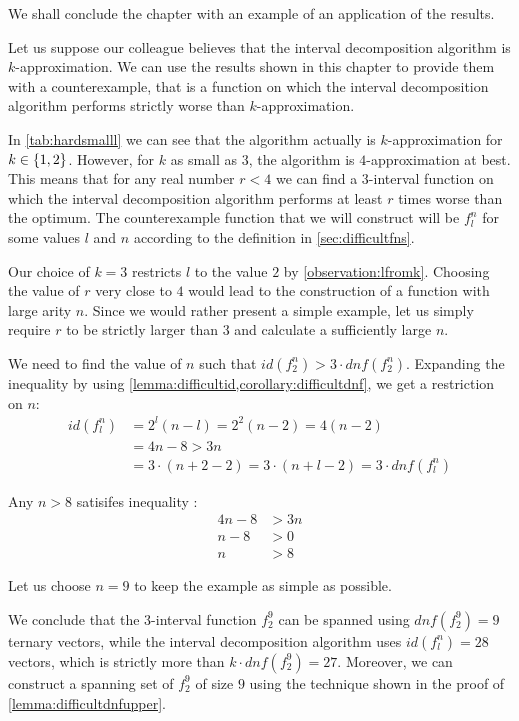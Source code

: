 We shall conclude the chapter with an example
of an application of the results.
\begin{example}
\label{example:approxidf24}
Let us
suppose our colleague believes
that the interval decomposition algorithm
is $k$-approximation.
We can use the results shown in this chapter
to provide them with a counterexample,
that is a function on which
the interval decomposition algorithm
performs strictly worse than $k$-approximation.

In \cref{tab:hardsmalll} we can see that the algorithm
actually is $k$-approximation for $k \in \{1, 2\}$.
However, for $k$ as small as $3$,
the algorithm is $4$-approximation at best.
This means that for any real number $r < 4$
we can find a $3$-interval function on which
the interval decomposition algorithm
performs at least $r$ times worse than the optimum.
The counterexample function that we will construct
will be $f_l^n$ for some values $l$ and $n$
according to the definition in \cref{sec:difficultfns}.

Our choice of $k=3$ restricts $l$ to the value $2$
by \cref{observation:lfromk}.
Choosing the value of $r$ very close to $4$
would lead to the construction of a function
with large arity $n$.
Since we would rather present a simple example,
let us
simply require $r$ to be strictly larger than $3$
and calculate a sufficiently large $n$.

We need to find the value of $n$ such that
$id(f_2^n) > 3 \cdot dnf(f_2^n)$.
Expanding the inequality by using
\cref{lemma:difficultid,corollary:difficultdnf},
we get a restriction on $n$:
\begin{align}
id(f_l^n) &= 2^l(n-l)
= 2^2(n-2)
= 4 (n-2) \nonumber \\
&= 4n - 8
> 3n
\label{ineq:examplef29} \\
&= 3 \cdot (n+2-2)
= 3 \cdot (n+l-2)
= 3 \cdot \mathit{dnf}(f_l^n) \nonumber
\end{align}

Any $n > 8$ satisifes
inequality :
\begin{align*}
4n - 8 &> 3n \\
n - 8 &> 0 \\
n &> 8
\end{align*}

Let us choose $n=9$
to keep the example as simple as possible.

We conclude that the $3$-interval function $f_2^9$
can be spanned using
$dnf(f_2^9) = 9$ ternary vectors,
while the interval decomposition algorithm
uses $id(f_l^n) = 28$ vectors,
which is strictly more than $k \cdot dnf(f_2^9) = 27$.
Moreover, we can construct a spanning set of $f_2^9$
of size $9$ using the technique shown
in the proof of \cref{lemma:difficultdnfupper}.
\end{example}
